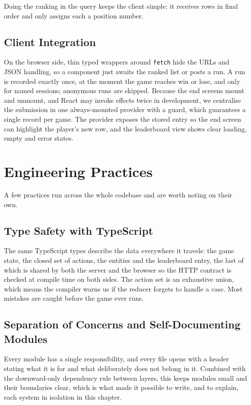 \documentclass[12pt,a4paper]{report}
\begin{document}
Doing the ranking in the query keeps the client simple: it receives rows in
final order and only assigns each a position number.

\subsection{Client Integration}

On the browser side, thin typed wrappers around \texttt{fetch} hide the URLs and
JSON handling, so a component just awaits the ranked list or posts a run. A run
is recorded exactly once, at the moment the game reaches win or lose, and only
for named sessions; anonymous runs are skipped. Because the end screens mount and
unmount, and React may invoke effects twice in development, we centralise the
submission in one always-mounted provider with a guard, which guarantees a single
record per game. The provider exposes the stored entry so the end screen can
highlight the player's new row, and the leaderboard view shows clear loading,
empty and error states.

\section{Engineering Practices}

A few practices run across the whole codebase and are worth noting on their own.

\subsection{Type Safety with TypeScript}

The same TypeScript types describe the data everywhere it travels: the game
state, the closed set of actions, the entities and the leaderboard entry, the
last of which is shared by both the server and the browser so the HTTP contract
is checked at compile time on both sides. The action set is an exhaustive union,
which means the compiler warns us if the reducer forgets to handle a case. Most
mistakes are caught before the game ever runs.

\subsection{Separation of Concerns and Self-Documenting Modules}

Every module has a single responsibility, and every file opens with a header
stating what it is for and what deliberately does not belong in it. Combined with
the downward-only dependency rule between layers, this keeps modules small and
their boundaries clear, which is what made it possible to write, and to explain,
each system in isolation in this chapter.
\end{document}
